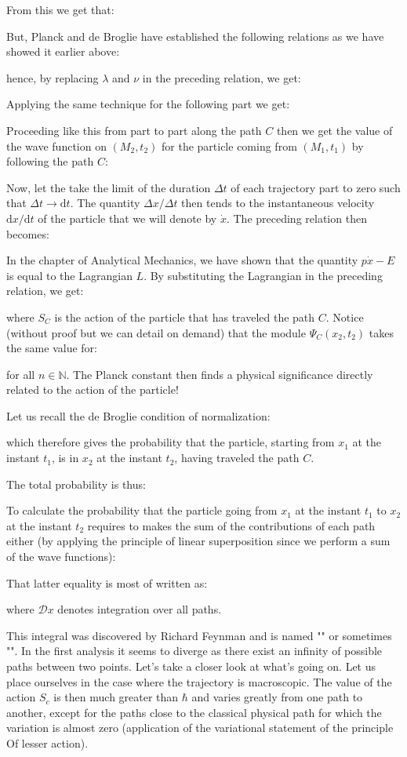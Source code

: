 	From this we get that:
	
	But, Planck and de Broglie have established the following relations as we have showed it earlier above:
	
	hence, by replacing $\lambda$ and $\nu$ in the preceding relation, we get:
	
	Applying the same technique for the following part we get:
	
	Proceeding like this from part to part along the path $C$ then we get the value of the wave function on $(M_2,t_2)$ for the particle coming from $(M_1,t_1)$ by following the path $C$:
	
	Now, let the take the limit of the duration $\Delta t$ of each trajectory part to zero such that $\Delta t\rightarrow \mathrm{d}t$. The quantity $\Delta x/\Delta t$ then tends to the instantaneous velocity $\mathrm{d}x/\mathrm{d}t$ of the particle that we will denote by $\dot{x}$. The preceding relation then becomes:
	
	In the chapter of Analytical Mechanics, we have shown that the quantity $p\dot{x}-E$ is equal to the Lagrangian $L$. By substituting the Lagrangian in the preceding relation, we get:
	
	where $S_C$ is the action of the particle that has traveled the path $C$.
	Notice (without proof but we can detail on demand) that the module $\Psi_C(x_2,t_2)$ takes the same value for:
	
	for all $n\in\mathbb{N}$. The Planck constant then finds a physical significance directly related to the action of the particle!

	Let us recall the de Broglie condition of normalization:
	
	which therefore gives the probability that the particle, starting from $x_1$ at the instant $t_1$, is in $x_2$ at the instant $t_2$, having traveled the path $C$.

	The total probability is thus:
	
	To calculate the probability that the particle going from $x_1$ at the instant $t_1$ to $x_2$ at the instant $t_2$ requires to makes the sum of the contributions of each path either (by applying the principle of linear superposition since we perform a sum of the wave functions):
	
	That latter equality is most of written as:
	
	where $\mathcal{D}x$ denotes integration over all paths.
	
	This integral was discovered by Richard Feynman and is named "" or sometimes "". In the first analysis it seems to diverge as there exist an infinity of possible paths between two points. Let's take a closer look at what's going on. Let us place ourselves in the case where the trajectory is macroscopic. The value of the action $S_c$ is then much greater than $\hbar$ and varies greatly from one path to another, except for the paths close to the classical physical path for which the variation is almost zero (application of the variational statement of the principle Of lesser action).

